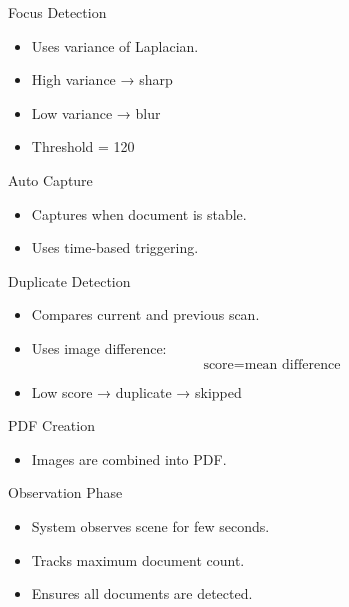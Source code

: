 \documentclass{beamer}
\begin{document}
\begin{frame}{Focus Detection}
\begin{itemize}
\item Uses variance of Laplacian.
\item High variance → sharp
\item Low variance → blur
\item Threshold = 120
\end{itemize}
\end{frame}

\begin{frame}{Auto Capture}
\begin{itemize}
\item Captures when document is stable.
\item Uses time-based triggering.
\end{itemize}
\end{frame}
\begin{frame}{Duplicate Detection}
\begin{itemize}
\item Compares current and previous scan.
\item Uses image difference:
\[
\text{score} = \text{mean difference}
\]
\item Low score → duplicate → skipped
\end{itemize}
\end{frame}

\begin{frame}{PDF Creation}
\begin{itemize}
\item Images are combined into PDF.
\end{itemize}
\end{frame}






\begin{frame}{Observation Phase}
\begin{itemize}
\item System observes scene for few seconds.
\item Tracks maximum document count.
\item Ensures all documents are detected.
\end{itemize}
\end{frame}
\end{document}
